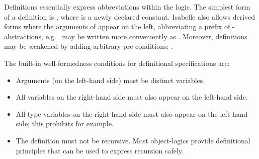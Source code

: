 \begin{isabellebody}
\begin{isamarkuptext}
\begin{descr}
  \end{descr}%
\end{isamarkuptext}%
\isamarkuptrue%
%
\isamarkuptrue%
%
\begin{isamarkuptext}%
Definitions essentially express abbreviations within the logic.  The
  simplest form of a definition is , where  is a newly declared constant.  Isabelle also allows derived forms
  where the arguments of  appear on the left, abbreviating a
  prefix of \isa{{\isasymlambda}}-abstractions, e.g.\  may be
  written more conveniently as .  Moreover,
  definitions may be weakened by adding arbitrary pre-conditions:
  .

  \medskip The built-in well-formedness conditions for definitional
  specifications are:

  \begin{itemize}

  \item Arguments (on the left-hand side) must be distinct variables.

  \item All variables on the right-hand side must also appear on the
  left-hand side.

  \item All type variables on the right-hand side must also appear on
  the left-hand side; this prohibits  for example.

  \item The definition must not be recursive.  Most object-logics
  provide definitional principles that can be used to express
  recursion safely.

  \end{itemize}


\end{isamarkuptext}
\end{isabellebody}
